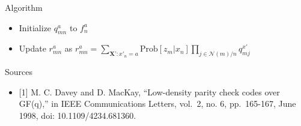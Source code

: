 \documentclass[10pt,ignorenonframetext,]{beamer}
\providecommand{\tightlist}{%
  \setlength{\itemsep}{0pt}\setlength{\parskip}{0pt}}
\begin{document}
\begin{frame}{Algorithm}
\protect\hypertarget{algorithm}{}
\begin{itemize}[<+->]
\tightlist
\item
  Initialize \(q_{mn}^a\) to \(f^a_n\)
\item
  Update \(r_{mn}^a\) as
  \(r_{mn}^a = \sum\limits_{\textbf{X'}:x'_n=a}\text{Prob}[z_m|x_n]\prod\limits_{j\in\mathcal{N}(m)/n}q^{x'}_{mj}\)
\end{itemize}
\end{frame}

\begin{frame}{Sources}
\protect\hypertarget{sources}{}
\begin{itemize}[<+->]
\tightlist
\item
  {[}1{]} M. C. Davey and D. MacKay, ``Low-density parity check codes
  over GF(q),'' in IEEE Communications Letters, vol.~2, no. 6,
  pp.~165-167, June 1998, doi: 10.1109/4234.681360.
\end{itemize}
\end{frame}
\end{document}
